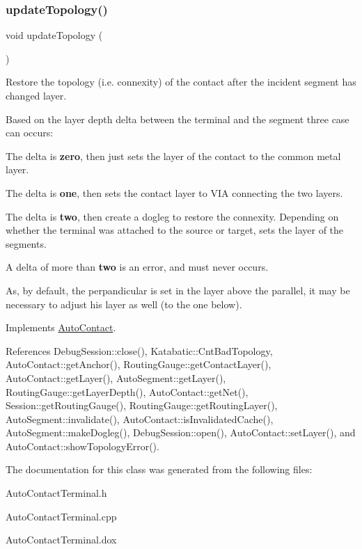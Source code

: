 \subsubsection{\texorpdfstring{update\+Topology()}{updateTopology()}}
{\footnotesize\ttfamily void update\+Topology (\begin{DoxyParamCaption}{ }\end{DoxyParamCaption})\hspace{0.3cm}{\ttfamily [virtual]}}

Restore the topology (i.\+e. connexity) of the contact after the incident segment has changed layer.

Based on the layer depth delta between the terminal and the segment three case can occurs\+:
\begin{DoxyItemize}
\item The delta is {\bfseries zero}, then just sets the layer of the contact to the common metal layer.
\item The delta is {\bfseries one}, then sets the contact layer to V\+IA connecting the two layers.
\item The delta is {\bfseries two}, then create a dogleg to restore the connexity. Depending on whether the terminal was attached to the source or target, sets the layer of the segments.
\item A delta of more than {\bfseries two} is an error, and must never occurs.
\end{DoxyItemize}

As, by default, the perpandicular is set in the layer above the parallel, it may be necessary to adjust his layer as well (to the one below).

 

Implements \hyperlink{classKatabatic_1_1AutoContact_a690764ddc997fe9766a79c4b8e0c3e2f}{Auto\+Contact}.



References Debug\+Session\+::close(), Katabatic\+::\+Cnt\+Bad\+Topology, Auto\+Contact\+::get\+Anchor(), Routing\+Gauge\+::get\+Contact\+Layer(), Auto\+Contact\+::get\+Layer(), Auto\+Segment\+::get\+Layer(), Routing\+Gauge\+::get\+Layer\+Depth(), Auto\+Contact\+::get\+Net(), Session\+::get\+Routing\+Gauge(), Routing\+Gauge\+::get\+Routing\+Layer(), Auto\+Segment\+::invalidate(), Auto\+Contact\+::is\+Invalidated\+Cache(), Auto\+Segment\+::make\+Dogleg(), Debug\+Session\+::open(), Auto\+Contact\+::set\+Layer(), and Auto\+Contact\+::show\+Topology\+Error().



The documentation for this class was generated from the following files\+:\begin{DoxyCompactItemize}
\item 
Auto\+Contact\+Terminal.\+h\item 
Auto\+Contact\+Terminal.\+cpp\item 
Auto\+Contact\+Terminal.\+dox\end{DoxyCompactItemize}

